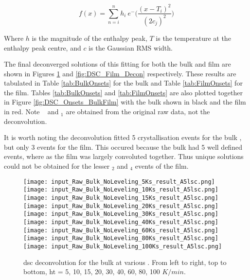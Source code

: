 \documentclass[a4paper,12pt,oneside]{article}%
\begin{document}
\begin{equation}
	f(x) = \sum_{n=i}^{n} h_{i}~ e^-{\bigg(\frac{(x-T_{i})^2}{(2c_{j})^2}\bigg)}
	\label{equ:GaussianSummation}
\end{equation}

Where $h$ is the magnitude of the enthalpy peak, $T$ is the temperature at the enthalpy peak centre, and $c$ is the Gaussian RMS width.

The final deconverged solutions of this fitting for both the bulk and film are shown in Figures \ref{fig:DSC_Bulk_Decon} and \ref{fig:DSC_Film_Decon} respectively. These results are tabulated in Table \ref{tab:BulkOnsets} for the bulk and Table \ref{tab:FilmOnsets} for the film. Tables \ref{tab:BulkOnsets} and \ref{tab:FilmOnsets} are also plotted together in Figure \ref{fig:DSC_Onsets_BulkFilm} with the bulk shown in black and the film in red. Note \Tg~ and \Tx$_{1}$ are obtained from the original raw data, not the deconvolution.

It is worth noting the deconvolution fitted 5 crystallisation events for the bulk \MgZnCa, but only 3 events for the film. This occured because the bulk had 5 well defined events, where as the film was largely convoluted together. Thus unique solutions could not be obtained for the lesser \Tx$_{2}$ and \Tx$_{4}$ events of the film. 

\begin{figure}[b]
	\centering
	\texttt{[image: input\_Raw\_Bulk\_NoLeveling\_5Ks\_result\_A5lsc.png]}\quad
	\texttt{[image: input\_Raw\_Bulk\_NoLeveling\_10Ks\_result\_A5lsc.png]}\quad
	\texttt{[image: input\_Raw\_Bulk\_NoLeveling\_15Ks\_result\_A5lsc.png]}
	\medskip
	\texttt{[image: input\_Raw\_Bulk\_NoLeveling\_20Ks\_result\_A5lsc.png]}\quad
	\texttt{[image: input\_Raw\_Bulk\_NoLeveling\_30Ks\_result\_A5lsc.png]}\quad
	\texttt{[image: input\_Raw\_Bulk\_NoLeveling\_40Ks\_result\_A5lsc.png]}
	\medskip
	\texttt{[image: input\_Raw\_Bulk\_NoLeveling\_60Ks\_result\_A5lsc.png]}\quad
	\texttt{[image: input\_Raw\_Bulk\_NoLeveling\_80Ks\_result\_A5lsc.png]}\quad
	\texttt{[image: input\_Raw\_Bulk\_NoLeveling\_100Ks\_result\_A5lsc.png]}
	\caption{\acrshort{dsc} deconvolution for the bulk at various . From left to right, top to bottom, \gls{ht} = 5, 10, 15, 20, 30, 40, 60, 80, 100 $K/min$.}
	\label{fig:DSC_Bulk_Decon}
\end{figure}
\end{document}
